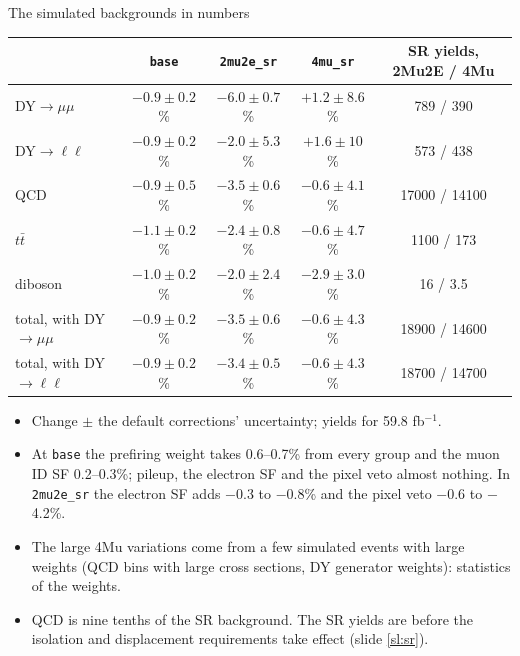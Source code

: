 \documentclass[aspectratio=169,11pt]{beamer}
\newcommand{\code}[1]{{\small\colorbox{codebg}{\texttt{#1}}}}
\begin{document}
\begin{frame}{The simulated backgrounds in numbers}
  \vspace{0.3em}
  {\footnotesize
  \begin{tabular}{@{}lcccc@{}}
    \toprule
    & \texttt{base} & \texttt{2mu2e\_sr} & \texttt{4mu\_sr} & SR yields, 2Mu2E / 4Mu \\
    \midrule
    DY$\to\mu\mu$ & $-0.9\pm0.2$\% & $-6.0\pm0.7$\% & $+1.2\pm8.6$\% & 789 / 390 \\
    DY$\to\ell\ell$ & $-0.9\pm0.2$\% & $-2.0\pm5.3$\% & $+1.6\pm10$\% & 573 / 438 \\
    QCD & $-0.9\pm0.5$\% & $-3.5\pm0.6$\% & $-0.6\pm4.1$\% & 17000 / 14100 \\
    $t\bar t$ & $-1.1\pm0.2$\% & $-2.4\pm0.8$\% & $-0.6\pm4.7$\% & 1100 / 173 \\
    diboson & $-1.0\pm0.2$\% & $-2.0\pm2.4$\% & $-2.9\pm3.0$\% & 16 / 3.5 \\
    \midrule
    total, with DY$\to\mu\mu$ & $-0.9\pm0.2$\% & $-3.5\pm0.6$\% & $-0.6\pm4.3$\% & 18900 / 14600 \\
    total, with DY$\to\ell\ell$ & $-0.9\pm0.2$\% & $-3.4\pm0.5$\% & $-0.6\pm4.3$\% & 18700 / 14700 \\
    \bottomrule
  \end{tabular}}

  \vspace{0.5em}
  {\footnotesize
  \begin{itemize}
    \item Change $\pm$ the default corrections' uncertainty; yields for 59.8 fb$^{-1}$.
    \item At \code{base} the prefiring weight takes 0.6--0.7\% from every group and the muon ID SF
          0.2--0.3\%; pileup, the electron SF and the pixel veto almost nothing. In
          \code{2mu2e\_sr} the electron SF adds $-$0.3 to $-$0.8\% and the pixel veto $-$0.6 to
          $-$4.2\%.
    \item The large 4Mu variations come from a few simulated events with large weights (QCD bins
          with large cross sections, DY generator weights): statistics of the weights.
    \item QCD is nine tenths of the SR background. The SR yields are before the isolation and
          displacement requirements take effect (slide \ref{sl:sr}).
  \end{itemize}}
\end{frame}
\end{document}
